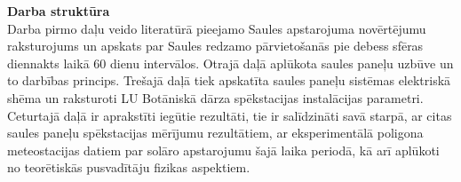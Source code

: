 \textbf{Darba struktūra}\\
Darba pirmo daļu veido literatūrā pieejamo Saules apstarojuma novērtējumu raksturojums un apskats par Saules redzamo pārvietošanās pie debess sfēras diennakts laikā 60 dienu intervālos. Otrajā daļā aplūkota saules paneļu uzbūve un to darbības princips. Trešajā daļā tiek apskatīta saules paneļu sistēmas elektriskā shēma un raksturoti LU Botāniskā dārza spēkstacijas instalācijas parametri.
Ceturtajā daļā ir aprakstīti iegūtie rezultāti, tie ir salīdzināti savā starpā, ar citas saules paneļu spēkstacijas mērījumu rezultātiem, ar eksperimentālā poligona meteostacijas datiem par solāro apstarojumu šajā laika periodā, kā arī aplūkoti no teorētiskās pusvadītāju fizikas aspektiem.



